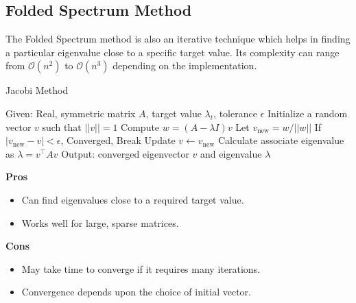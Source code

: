 \documentclass{article}
\begin{document}
\subsection{Folded Spectrum Method}
The Folded Spectrum method is also an iterative technique which helps in finding a particular eigenvalue close to a specific target value. Its complexity can range from $\mathcal{O}(n^2)$ to $\mathcal{O}(n^3)$ depending on the implementation.

\begin{algorithm}[H]
    \caption{Jacobi Method}
    \begin{algorithmic}[1]
        \Statex Given: Real, symmetric matrix $A$, target value $\lambda_t$, tolerance $\epsilon$
        \State Initialize a random vector $v$ such that $||v|| = 1$
        \Repeat
            \State Compute $w = (A - \lambda I) v$
            \State Let $v_{\text{new}} = w/||w||$
            \State If $|v_{\text{new}}-v| < \epsilon$, Converged, Break
            \State Update $v\leftarrow v_{\text{new}}$
        \State Calculate associate eigenvalue as $\lambda = v^{\top} A v$
        \Statex Output: converged eigenvector $v$ and eigenvalue $\lambda$ 
    \end{algorithmic}
\end{algorithm}

\begin{multicols}{2}
\begin{center}\textbf{Pros}\end{center}
\begin{itemize}
    \item Can find eigenvalues close to a required target value.
    \item Works well for large, sparse matrices.
\end{itemize}
\columnbreak
\begin{center}\textbf{Cons}\end{center}
\begin{itemize}
    \item May take time to converge if it requires many iterations.
    \item Convergence depends upon the choice of initial vector.
\end{itemize}
\end{multicols}

\end{document}
